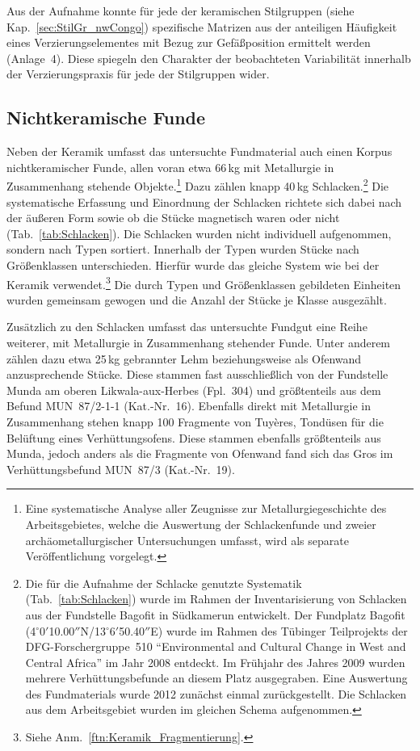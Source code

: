 \begin{multicols}{2}
Aus der Aufnahme konnte für jede der keramischen Stilgruppen (siehe Kap.~\ref{sec:StilGr_nwCongo}) spezifische Matrizen aus der anteiligen Häufigkeit eines Verzierungselementes mit Bezug zur Gefäßposition ermittelt werden (Anlage~4). Diese spiegeln den Charakter der beobachteten Variabilität innerhalb der Verzierungspraxis für jede der Stilgruppen wider.



\subsection{Nichtkeramische Funde}

Neben der Keramik umfasst das untersuchte Fundmaterial auch einen Korpus nichtkeramischer Funde, allen voran etwa 66\,kg mit Metallurgie in Zusammenhang stehende Objekte.\footnote{Eine systematische Analyse aller Zeugnisse zur Metallurgiegeschichte des Arbeitsgebietes, welche die Auswertung der Schlackenfunde und zweier archäometallurgischer Untersuchungen umfasst, wird als separate Veröffentlichung vorgelegt.} Dazu zählen knapp 40\,kg Schlacken.\footnote{Die für die Aufnahme der Schlacke genutzte Systematik (Tab.~\ref{tab:Schlacken}) wurde im Rahmen der Inventarisierung von Schlacken aus der Fundstelle Bagofit in Südkamerun entwickelt. Der Fundplatz Bagofit (4$^\circ$0$'$10.00$''$N/13$^\circ$6$'$50.40$''$E) wurde im Rahmen des Tübinger Teilprojekts der DFG-Forschergruppe~510 \enquote{Environmental and Cultural Change in West and Central Africa} im Jahr 2008 entdeckt. Im Frühjahr des Jahres 2009 wurden mehrere Verhüttungsbefunde an diesem Platz ausgegraben. Eine Auswertung des Fundmaterials wurde 2012 zunächst einmal zurückgestellt. Die Schlacken aus dem Arbeitsgebiet wurden im gleichen Schema aufgenommen.} Die systematische Erfassung und Einordnung der Schlacken richtete sich dabei nach der äußeren Form sowie ob die Stücke magnetisch waren oder nicht (Tab.~\ref{tab:Schlacken}). Die Schlacken wurden nicht individuell aufgenommen, sondern nach Typen sortiert. Innerhalb der Typen wurden Stücke nach Größenklassen unterschieden. Hierfür wurde das gleiche System wie bei der Keramik verwendet.\footnote{Siehe Anm.~\ref{ftn:Keramik_Fragmentierung}.} Die durch Typen und Größenklassen gebildeten Einheiten wurden gemeinsam gewogen und die Anzahl der Stücke je Klasse ausgezählt.

Zusätzlich zu den Schlacken umfasst das untersuchte Fundgut eine Reihe weiterer, mit Metallurgie in Zusammenhang stehender Funde. Unter anderem zählen dazu etwa 25\,kg gebrannter Lehm beziehungsweise als Ofenwand anzusprechende Stücke. Diese stammen fast ausschließlich von der Fundstelle Munda am oberen \mbox{Likwala}-\mbox{aux}-\mbox{Herbes} (Fpl.~304) und größtenteils aus dem Befund MUN~87/2-1-1 (Kat.-Nr.~16). Ebenfalls direkt mit Metallurgie in Zusammenhang stehen knapp 100 Fragmente von Tuyères, Tondüsen für die Belüftung eines Verhüttungsofens. Diese stammen ebenfalls größtenteils aus Munda, jedoch anders als die Fragmente von Ofenwand fand sich das Gros im Verhüttungsbefund MUN~87/3 (Kat.-Nr.~19).\columnbreak


\end{multicols}
